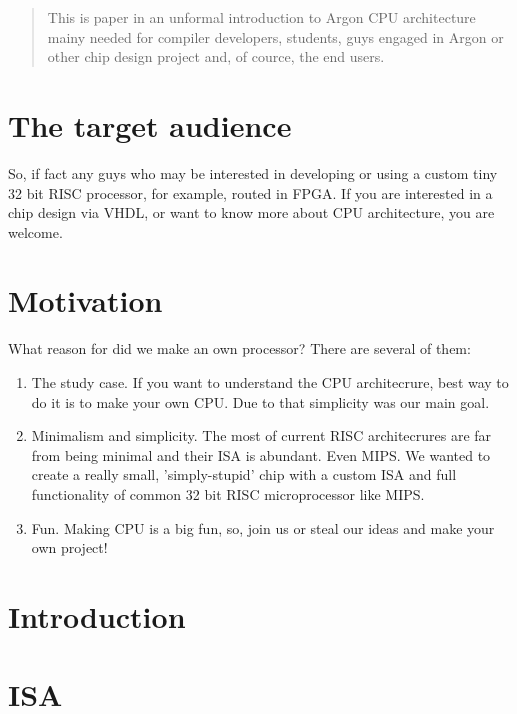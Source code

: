 \documentclass[12pt]{article}
\begin{document}
\maketitle

\begin{abstract}
This is paper in an unformal introduction to Argon CPU architecture mainy needed for compiler developers, students, guys engaged in Argon or other chip design project and, of cource, the end users. 

\end{abstract}


\section{The target audience}
So, if fact any guys who may be interested in developing or using a custom tiny 32 bit RISC processor, for example, routed in FPGA. If you are interested in a chip design via VHDL, or want to know more about CPU architecture, you are welcome.


\section{Motivation}

What reason for did we make an own processor? There are several of them:

\begin{enumerate}
\item The study case. If you want to understand the CPU architecrure, best way to do it is to make your own CPU. Due to that simplicity was our main goal.

\item Minimalism and simplicity. The most of current RISC architecrures are far from being minimal and their ISA is abundant. Even MIPS. We wanted to create a really small, 'simply-stupid' chip with a custom ISA and full functionality of common 32 bit RISC microprocessor like MIPS.

\item Fun. Making CPU is a big fun, so, join us or steal our ideas and make your own project!

\end{enumerate}

\section{Introduction}

\section{ISA}
\end{document}
